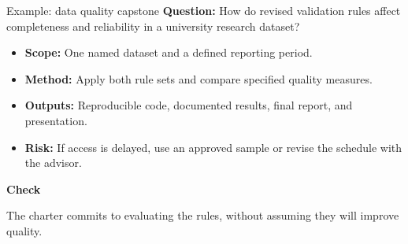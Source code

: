 \documentclass[aspectratio=43,11pt]{beamer}
\newcommand{\checkit}[1]{\medskip\textbf{Check}\par #1}
\begin{document}
\begin{frame}{Example: data quality capstone}
  \textbf{Question:} How do revised validation rules affect completeness and reliability in a university research dataset?
  \medskip
  \begin{itemize}
    \item \textbf{Scope:} One named dataset and a defined reporting period.
    \item \textbf{Method:} Apply both rule sets and compare specified quality measures.
    \item \textbf{Outputs:} Reproducible code, documented results, final report, and presentation.
    \item \textbf{Risk:} If access is delayed, use an approved sample or revise the schedule with the advisor.
  \end{itemize}
  
  \checkit{The charter commits to evaluating the rules, without assuming they will improve quality.}
\end{frame}
\end{document}
